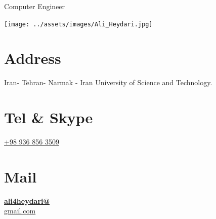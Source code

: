 \documentclass[a4paper]{friggeri-cv}
\begin{document}
    {Computer Engineer}


    \begin{aside}
        \texttt{[image: ../assets/images/Ali\_Heydari.jpg]}
        \section{Address}\label{sec:address}
        Iran- Tehran- Narmak -
        Iran University of Science and Technology.
        ~
        \section{Tel \& Skype}\label{sec:tel&skype}
        \href{tel:+989368563509}{+98 936 856 3509}
        ~
        \section{Mail}\label{sec:mail}
        \href{mailto:ali4heydari@gmail.com}{\textbf{ali4heydari@}\\gmail.com}
        ~

\end{aside}
\end{document}

